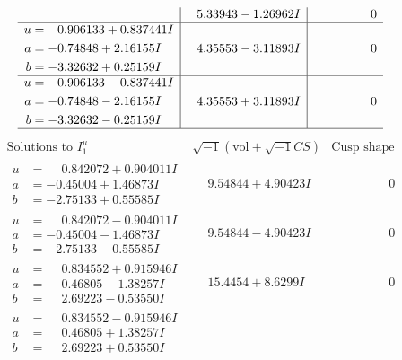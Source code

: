 \documentclass[1p]{elsarticle_modified}
\theoremstyle{definition}
\newcommand{\I}{\sqrt{-1}}
\begin{document}
$$\begin{array}{c|c|c}
 & \phantom{-}5.33943 - 1.26962 I & \phantom{-0.000000 } 0 \\ \hline\begin{aligned}
u &= \phantom{-}0.906133 + 0.837441 I \\
a &= -0.74848 + 2.16155 I \\
b &= -3.32632 + 0.25159 I\end{aligned}
 & \phantom{-}4.35553 - 3.11893 I & \phantom{-0.000000 } 0 \\ \hline\begin{aligned}
u &= \phantom{-}0.906133 - 0.837441 I \\
a &= -0.74848 - 2.16155 I \\
b &= -3.32632 - 0.25159 I\end{aligned}
 & \phantom{-}4.35553 + 3.11893 I & \phantom{-0.000000 } 0\\
 \hline 
 \end{array}$$\newpage$$\begin{array}{c|c|c}  
\text{Solutions to }I^u_{1}& \I (\text{vol} + \sqrt{-1}CS) & \text{Cusp shape}\\
 \hline 
\begin{aligned}
u &= \phantom{-}0.842072 + 0.904011 I \\
a &= -0.45004 + 1.46873 I \\
b &= -2.75133 + 0.55585 I\end{aligned}
 & \phantom{-}9.54844 + 4.90423 I & \phantom{-0.000000 } 0 \\ \hline\begin{aligned}
u &= \phantom{-}0.842072 - 0.904011 I \\
a &= -0.45004 - 1.46873 I \\
b &= -2.75133 - 0.55585 I\end{aligned}
 & \phantom{-}9.54844 - 4.90423 I & \phantom{-0.000000 } 0 \\ \hline\begin{aligned}
u &= \phantom{-}0.834552 + 0.915946 I \\
a &= \phantom{-}0.46805 - 1.38257 I \\
b &= \phantom{-}2.69223 - 0.53550 I\end{aligned}
 & \phantom{-}15.4454 + 8.6299 I & \phantom{-0.000000 } 0 \\ \hline\begin{aligned}
u &= \phantom{-}0.834552 - 0.915946 I \\
a &= \phantom{-}0.46805 + 1.38257 I \\
b &= \phantom{-}2.69223 + 0.53550 I\end{aligned}

\end{array}$$
\end{document}
